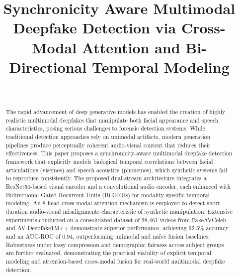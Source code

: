 \documentclass[conference]{IEEEtran}
\begin{document}
\title{Synchronicity Aware Multimodal Deepfake Detection via Cross-Modal Attention and Bi-Directional Temporal Modeling}



\author{
\\ 
}

\maketitle

\begin{abstract}
The rapid advancement of deep generative models has enabled the creation of highly realistic multimodal deepfakes that manipulate both facial appearance and speech characteristics, posing serious challenges to forensic detection systems. While traditional detection approaches rely on unimodal artifacts, modern generation pipelines produce perceptually coherent audio-visual content that reduces their effectiveness. This paper proposes a synchronicity-aware multimodal deepfake detection framework that explicitly models biological temporal correlations between facial articulations (visemes) and speech acoustics (phonemes), which synthetic systems fail to reproduce consistently. The proposed dual-stream architecture integrates a ResNet50-based visual encoder and a convolutional audio encoder, each enhanced with Bidirectional Gated Recurrent Units (Bi-GRUs) for modality-specific temporal modeling. An 8-head cross-modal attention mechanism is employed to detect short-duration audio-visual misalignments characteristic of synthetic manipulation. Extensive experiments conducted on a consolidated dataset of 28,461 videos from FakeAVCeleb and AV-Deepfake1M++ demonstrate superior performance, achieving 92.5\% accuracy and an AUC-ROC of 0.94, outperforming unimodal and naïve fusion baselines. Robustness under lossy compression and demographic fairness across subject groups are further evaluated, demonstrating the practical viability of explicit temporal modeling and attention-based cross-modal fusion for real-world multimodal deepfake detection.
\end{abstract}
\end{document}
